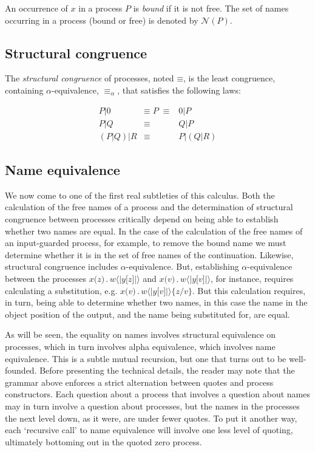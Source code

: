 \documentclass[]{entcs}
\newcommand{\lliftb}{\langle\!|}
\newcommand{\rliftb}{|\!\rangle}
\newcommand{\id}[1]{\texttt{#1}}
\newcommand{\pzero}{\mathbin{0}}
\newcommand{\juxtap}{\mathbin{\id{|}}}
\newcommand{\concat}{\mathbin{.}}
\newcommand{\scong}{\mathbin{\equiv}}
\newcommand{\alphaeq}{\mathbin{\equiv_{\alpha}}}
\newcommand{\names}[1]{\mathbin{\mathcal{N}(#1)}}
\newcommand{\lift}[2]{#1 \lliftb #2 \rliftb}
\begin{document}
An occurrence of $x$ in a process $P$ is \textit{bound} if it is not
free. The set of names occurring in a process (bound or free) is
denoted by $\names{P}$.

\subsection{Structural congruence}

The {\em structural congruence} of processes, noted $\scong$, is the
least congruence, containing $\alpha$-equivalence, $\alphaeq$, that
satisfies the following laws:

\begin{eqnarray}
	{P} \juxtap \pzero	
		&  \scong \; {P} \; \scong & 
			\pzero \juxtap {P} \nonumber\\
	{P} \juxtap {Q}	
		& \scong & 
			{Q} \juxtap {P} \nonumber\\
	({P} \juxtap {Q}) \juxtap {R}
		& \scong & 
			{P} \juxtap ({Q} \juxtap {R}) \nonumber
\end{eqnarray}

\subsection{Name equivalence}

We now come to one of the first real subtleties of this calculus. Both
the calculation of the free names of a process and the determination
of structural congruence between processes critically depend on being
able to establish whether two names are equal. In the case of the
calculation of the free names of an input-guarded process, for
example, to remove the bound name we must determine whether it is in
the set of free names of the continuation. Likewise, structural
congruence includes $\alpha$-equivalence. But, establishing
$\alpha$-equivalence between the processes $x \id{(} z \id{)}\concat \lift{w}{y
\id{[}z\id{]}}$ and $x \id{(} v \id{)}\concat \lift{w}{y
\id{[}v\id{]}}$, for instance, requires calculating a substitution, e.g. $x \id{(} v \id{)}\concat \lift{w}{y
\id{[}v\id{]}} \id{\{}z / v \id{\}}$. But this calculation requires, in turn, being able to
determine whether two names, in this case the name in the object
position of the output, and the name being substituted for, are equal.

As will be seen, the equality on names involves structural equivalence
on processes, which in turn involves alpha equivalence, which involves
name equivalence. This is a subtle mutual recursion, but one that
turns out to be well-founded. Before presenting the technical details,
the reader may note that the grammar above enforces a strict
alternation between quotes and process constructors. Each question
about a process that involves a question about names may in turn
involve a question about processes, but the names in the processes the
next level down, as it were, are under fewer quotes. To put it another
way, each `recursive call' to name equivalence will involve one less
level of quoting, ultimately bottoming out in the quoted zero process.
\end{document}
